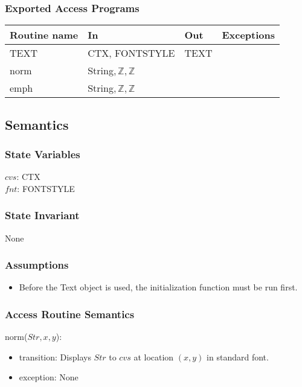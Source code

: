 \documentclass[12pt]{article}
\begin{document}
\subsubsection*{Exported Access Programs}

\begin{tabular}{| l | l | l | l |}
\hline
\textbf{Routine name} & \textbf{In} & \textbf{Out} & \textbf{Exceptions}\\
\hline
TEXT & CTX, FONTSTYLE & TEXT & ~\\
\hline
norm & String$, \mathbb{Z}, \mathbb{Z}$ &  & ~\\
\hline
emph & String$, \mathbb{Z}, \mathbb{Z}$ &  & ~\\
\hline
\end{tabular}

\subsection*{Semantics}

\subsubsection*{State Variables}

$cvs$: CTX\\
$fnt$: FONTSTYLE\\

\subsubsection*{State Invariant}

None

\subsubsection*{Assumptions}

\begin{itemize}
  \item Before the Text object is used, the initialization function must be run first.
\end{itemize}

\subsubsection*{Access Routine Semantics}

norm($Str,x,y$):
\begin{itemize}
    \item transition: Displays $Str$ to $cvs$ at location $(x,y)$ in standard font.
    \item exception: None
\end{itemize}
\end{document}
